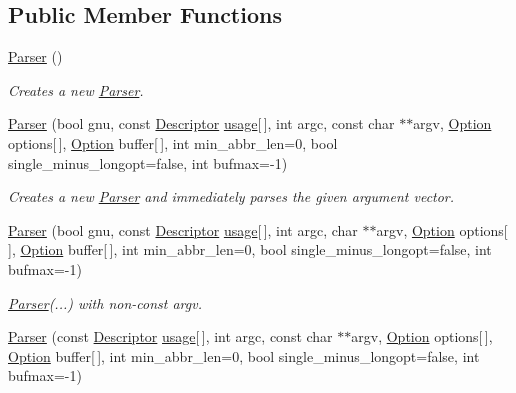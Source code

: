 \subsection*{Public Member Functions}
\begin{DoxyCompactItemize}
\item 
\hyperlink{class_option_parser_1_1_parser_a52e8caf4f946780051e093bad1c966e3}{Parser} ()
\begin{DoxyCompactList}\small\item\em Creates a new \hyperlink{class_option_parser_1_1_parser}{Parser}. \end{DoxyCompactList}\item 
\hyperlink{class_option_parser_1_1_parser_a7a82d034afe73e9954c47ab7363dfa5c}{Parser} (bool gnu, const \hyperlink{struct_option_parser_1_1_descriptor}{Descriptor} \hyperlink{_selective_community_detection-_x_8cpp_ae4e685e845abde182eb8fc1f87b756ae}{usage}\mbox{[}$\,$\mbox{]}, int argc, const char $\ast$$\ast$argv, \hyperlink{class_option_parser_1_1_option}{Option} options\mbox{[}$\,$\mbox{]}, \hyperlink{class_option_parser_1_1_option}{Option} buffer\mbox{[}$\,$\mbox{]}, int min\-\_\-abbr\-\_\-len=0, bool single\-\_\-minus\-\_\-longopt=false, int bufmax=-\/1)
\begin{DoxyCompactList}\small\item\em Creates a new \hyperlink{class_option_parser_1_1_parser}{Parser} and immediately parses the given argument vector. \end{DoxyCompactList}\item 
\hyperlink{class_option_parser_1_1_parser_ae4937e1f7695045b9a94f40ec858eda6}{Parser} (bool gnu, const \hyperlink{struct_option_parser_1_1_descriptor}{Descriptor} \hyperlink{_selective_community_detection-_x_8cpp_ae4e685e845abde182eb8fc1f87b756ae}{usage}\mbox{[}$\,$\mbox{]}, int argc, char $\ast$$\ast$argv, \hyperlink{class_option_parser_1_1_option}{Option} options\mbox{[}$\,$\mbox{]}, \hyperlink{class_option_parser_1_1_option}{Option} buffer\mbox{[}$\,$\mbox{]}, int min\-\_\-abbr\-\_\-len=0, bool single\-\_\-minus\-\_\-longopt=false, int bufmax=-\/1)
\begin{DoxyCompactList}\small\item\em \hyperlink{class_option_parser_1_1_parser}{Parser}(...) with non-\/const argv. \end{DoxyCompactList}\item 
\hyperlink{class_option_parser_1_1_parser_a7d01e47bdc5c96653b90ca06effbb4d0}{Parser} (const \hyperlink{struct_option_parser_1_1_descriptor}{Descriptor} \hyperlink{_selective_community_detection-_x_8cpp_ae4e685e845abde182eb8fc1f87b756ae}{usage}\mbox{[}$\,$\mbox{]}, int argc, const char $\ast$$\ast$argv, \hyperlink{class_option_parser_1_1_option}{Option} options\mbox{[}$\,$\mbox{]}, \hyperlink{class_option_parser_1_1_option}{Option} buffer\mbox{[}$\,$\mbox{]}, int min\-\_\-abbr\-\_\-len=0, bool single\-\_\-minus\-\_\-longopt=false, int bufmax=-\/1)
$$
\end{DoxyCompactItemize}
